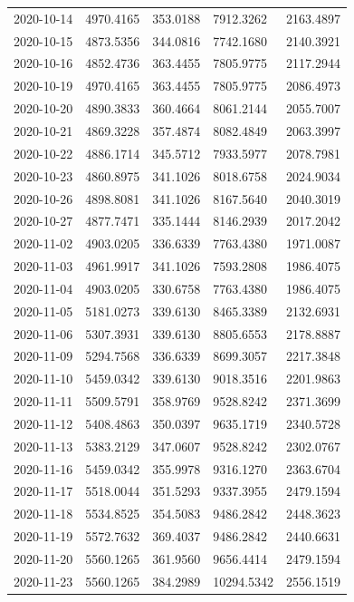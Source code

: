 \begin{footnotesize}
\begin{longtable}{lllll}
2020-10-14 & 4970.4165 & 353.0188 & 7912.3262 & 2163.4897 \\
2020-10-15 & 4873.5356 & 344.0816 & 7742.1680 & 2140.3921 \\
2020-10-16 & 4852.4736 & 363.4455 & 7805.9775 & 2117.2944 \\
2020-10-19 & 4970.4165 & 363.4455 & 7805.9775 & 2086.4973 \\
2020-10-20 & 4890.3833 & 360.4664 & 8061.2144 & 2055.7007 \\
2020-10-21 & 4869.3228 & 357.4874 & 8082.4849 & 2063.3997 \\
2020-10-22 & 4886.1714 & 345.5712 & 7933.5977 & 2078.7981 \\
2020-10-23 & 4860.8975 & 341.1026 & 8018.6758 & 2024.9034 \\
2020-10-26 & 4898.8081 & 341.1026 & 8167.5640 & 2040.3019 \\
2020-10-27 & 4877.7471 & 335.1444 & 8146.2939 & 2017.2042 \\
2020-11-02 & 4903.0205 & 336.6339 & 7763.4380 & 1971.0087 \\
2020-11-03 & 4961.9917 & 341.1026 & 7593.2808 & 1986.4075 \\
2020-11-04 & 4903.0205 & 330.6758 & 7763.4380 & 1986.4075 \\
2020-11-05 & 5181.0273 & 339.6130 & 8465.3389 & 2132.6931 \\
2020-11-06 & 5307.3931 & 339.6130 & 8805.6553 & 2178.8887 \\
2020-11-09 & 5294.7568 & 336.6339 & 8699.3057 & 2217.3848 \\
2020-11-10 & 5459.0342 & 339.6130 & 9018.3516 & 2201.9863 \\
2020-11-11 & 5509.5791 & 358.9769 & 9528.8242 & 2371.3699 \\
2020-11-12 & 5408.4863 & 350.0397 & 9635.1719 & 2340.5728 \\
2020-11-13 & 5383.2129 & 347.0607 & 9528.8242 & 2302.0767 \\
2020-11-16 & 5459.0342 & 355.9978 & 9316.1270 & 2363.6704 \\
2020-11-17 & 5518.0044 & 351.5293 & 9337.3955 & 2479.1594 \\
2020-11-18 & 5534.8525 & 354.5083 & 9486.2842 & 2448.3623 \\
2020-11-19 & 5572.7632 & 369.4037 & 9486.2842 & 2440.6631 \\
2020-11-20 & 5560.1265 & 361.9560 & 9656.4414 & 2479.1594 \\
2020-11-23 & 5560.1265 & 384.2989 & 10294.5342 & 2556.1519 \\

\end{longtable}
\end{footnotesize}
